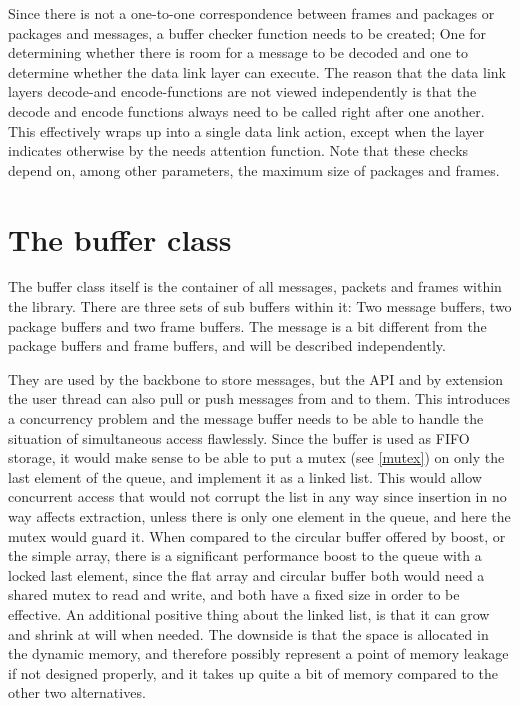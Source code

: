 Since there is not a one-to-one correspondence between frames and packages or packages and messages, a buffer checker function needs to be created; One for determining whether there is room for a message to be decoded and one to determine whether the data link layer can execute. The reason that the data link layers decode-and encode-functions are not viewed independently is that the decode and encode functions always need to be called right after one another. This effectively wraps up into a single data link action, except when the layer indicates otherwise by the needs attention function.
Note that these checks depend on, among other parameters, the maximum size of packages and frames.





\section{The buffer class}
\label{bufferclass}
The buffer class itself is the container of all messages, packets and frames within the library. There are three sets of sub buffers within it: Two message buffers, two package buffers and two frame buffers. 
The message is a bit different from the package buffers and frame buffers, and will be described independently. 

They are used by the backbone to store messages, but the API and by extension the user thread can also pull or push messages from and to them. This introduces a concurrency problem and the message buffer needs to be able to handle the situation of simultaneous access flawlessly.
Since the buffer is used as FIFO storage, it would make sense to be able to put a mutex (see \ref{mutex}) on only the last element of the queue, and implement it as a linked list.
This would allow concurrent access that would not corrupt the list in any way since insertion in no way affects extraction, unless there is only one element in the queue, and here the mutex would guard it.
When compared to the circular buffer offered by boost, or the simple array, there is a significant performance boost to the queue with a locked last element, since the flat array and circular buffer both would need a shared mutex to read and write, and both have a fixed size in order to be effective.
An additional positive thing about the linked list, is that it can grow and shrink at will when needed. The downside is that the space is allocated in the dynamic memory, and therefore possibly represent a point of memory leakage if not designed properly, and it takes up quite a bit of memory compared to the other two alternatives.

